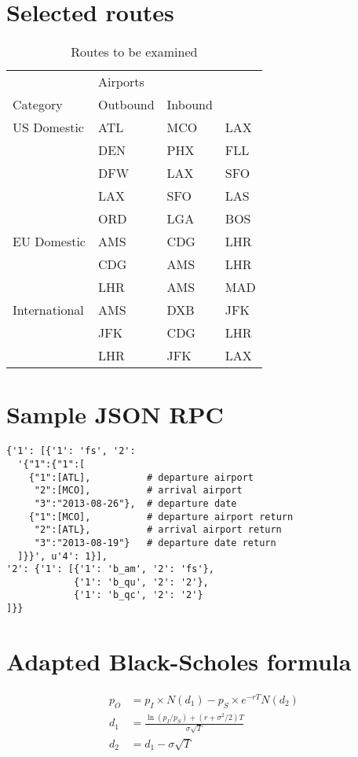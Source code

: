 \chapter{Selected routes}
\label{app:SelectedRoutes}
\begin{table}[h]
	\centering
    \begin{tabular}{ l l l l }
        \toprule
        ~           & Airports & ~ \\
        \cmidrule{2-4}
        Category        & Outbound & Inbound        \\ 
        \midrule
        US Domestic & ATL & MCO & LAX \\
        ~           & DEN & PHX & FLL \\
        ~           & DFW & LAX & SFO \\
        ~           & LAX & SFO & LAS \\
        ~           & ORD & LGA & BOS \\
        EU Domestic & AMS & CDG & LHR \\
		~           & CDG & AMS & LHR \\
		~           & LHR & AMS & MAD \\
        International & AMS & DXB & JFK \\ 
        ~             & JFK & CDG & LHR \\
        ~             & LHR & JFK & LAX \\
        \bottomrule
    \end{tabular}
	\caption{Routes to be examined}
\end{table}



\chapter{Sample JSON RPC}
\label{app:SampleJSONRPC}
\small
\begin{verbatim}
{'1': [{'1': 'fs', '2':
  '{"1":{"1":[
    {"1":[ATL],          # departure airport
     "2":[MCO],          # arrival airport
     "3":"2013-08-26"},  # departure date
    {"1":[MCO],          # departure airport return
     "2":[ATL},          # arrival airport return
     "3":"2013-08-19"}   # departure date return
  ]}}', u'4': 1}],
'2': {'1': [{'1': 'b_am', '2': 'fs'},
            {'1': 'b_qu', '2': '2'},
            {'1': 'b_qc', '2': '2'}
]}}
\end{verbatim}



\chapter{Adapted Black-Scholes formula}
\label{app:AdaptedBlackScholesFormula}
\begin{align*}
p_O &= p_I \times N(d_1) - p_S \times e^{-rT}N(d_2) \\
d_1 &= \frac{\ln(p_I/p_S) + (r + \sigma^2/2)T}{\sigma \sqrt{T}} \\
d_2 &= d_1 - \sigma \sqrt{T}
\end{align*}

